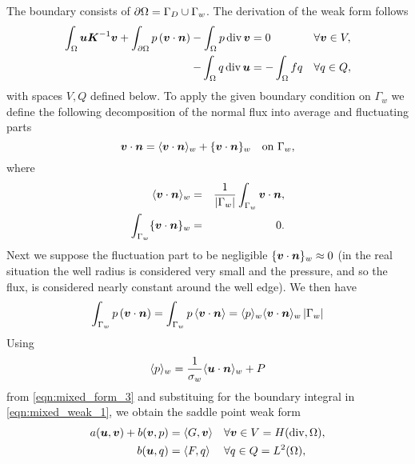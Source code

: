 The boundary consists of $\partial\Omega=\Gamma_D \cup \Gamma_w$. The derivation of the weak form follows
\begin{align}
    \int_\Omega \mathbf{\boldsymbol{u}} \mathbf{\boldsymbol{K}}^{-1} \mathbf{\boldsymbol{v}}
    + \int_{\partial\Omega} p \,(\mathbf{\boldsymbol{v}} \cdot \mathbf{\boldsymbol{n}})
    - \int_\Omega p\,{\rm div}\, \mathbf{\boldsymbol{v}} &= 0 && \forall \mathbf{\boldsymbol{v}}\in V, \label{eqn:mixed_weak_1}\\
    - \int_\Omega q\,{\rm div}\, \mathbf{\boldsymbol{u}} &= - \int_\Omega fq &&  \forall q\in Q, \label{eqn:mixed_weak_2}
\end{align}
with spaces $V,Q$ defined below.
To apply the given boundary condition on $\Gamma_w$ we define
the following decomposition of the normal flux into average and fluctuating parts
\begin{equation}
    \mathbf{\boldsymbol{v}}\cdot\mathbf{\boldsymbol{n}} = \langle\mathbf{\boldsymbol{v}}\cdot \mathbf{\boldsymbol{n}}\rangle_w + \{\mathbf{\boldsymbol{v}}\cdot \mathbf{\boldsymbol{n}}\}_w \quad \textrm{on } \Gamma_w,
\end{equation}
where
\begin{eqnarray}
    \langle\mathbf{\boldsymbol{v}}\cdot \mathbf{\boldsymbol{n}}\rangle_w &=& \frac{1}{{\left|\Gamma_w\right|}} \int_{\Gamma_w} \mathbf{\boldsymbol{v}}\cdot \mathbf{\boldsymbol{n}}, \\
    \int_{\Gamma_w} \{\mathbf{\boldsymbol{v}}\cdot \mathbf{\boldsymbol{n}}\}_w &=& 0. \\
\end{eqnarray}
Next we suppose the fluctuation part to be negligible $\{\mathbf{\boldsymbol{v}}\cdot \mathbf{\boldsymbol{n}}\}_w \approx 0$
(in the real situation the well radius is considered very small and the pressure, and so the flux,
is considered nearly constant around the well edge).
We then have
\begin{equation}
    \int_{\Gamma_w} p \,(\mathbf{\boldsymbol{v}} \cdot \mathbf{\boldsymbol{n}}) = \int_{\Gamma_w} p \,\langle\mathbf{\boldsymbol{v}} \cdot \mathbf{\boldsymbol{n}}\rangle 
    = \langle p\rangle_w \langle\mathbf{\boldsymbol{v}} \cdot \mathbf{\boldsymbol{n}}\rangle_w \left|\Gamma_w\right|
\end{equation}
Using
\begin{equation}
    \langle p\rangle_w = \frac{1}{\sigma_w}\langle\mathbf{\boldsymbol{u}}\cdot \mathbf{\boldsymbol{n}}\rangle_w + P
\end{equation}
from \eqref{eqn:mixed_form_3} and substituing for the boundary integral in \eqref{eqn:mixed_weak_1},
we obtain the saddle point weak form
\begin{align}
    a(\mathbf{\boldsymbol{u}},\mathbf{\boldsymbol{v}}) + b(\mathbf{\boldsymbol{v}}, p) &= \langle G, \mathbf{\boldsymbol{v}}\rangle &&
        \forall \mathbf{\boldsymbol{v}}\in V = H({\rm div},\Omega), \label{eqn:mixed_saddle1}\\
    b(\mathbf{\boldsymbol{u}}, q) &= \langle F, q \rangle &&\forall q \in Q=L^2(\Omega)
        \label{eqn:mixed_saddle2},
\end{align}
